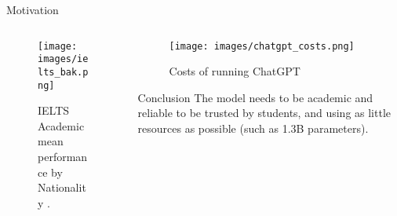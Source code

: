 \documentclass[10pt]{beamer}
\begin{document}
\begin{frame}{Motivation}

\begin{columns}[t]
\begin{column}{5cm}

 \begin{figure}
\texttt{[image: images/ielts\_bak.png]}
\caption{IELTS Academic mean performance by Nationality .}
\label{table:IELTS Academic mean performance}
\end{figure}

\end{column}
\begin{column}{5cm}
\pause
\begin{figure}
    \centering \texttt{[image: images/chatgpt\_costs.png]}
    \caption{Costs of running ChatGPT}
\end{figure}

\pause
\begin{block}{Conclusion}
    The model needs to be academic and reliable to be trusted by students, and using as little resources as possible (such as 1.3B parameters).
\end{block}
\end{column}
\end{columns}



    
\end{frame}



    
\end{document}
